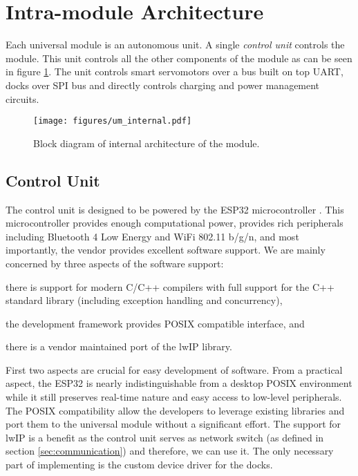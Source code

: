\section{Intra-module Architecture}

Each universal module is an autonomous unit. A single \emph{control unit}
controls the module. This unit controls all the other components of the module
as can be seen in figure \ref{fig:um_internal}. The unit controls smart
servomotors over a bus built on top UART, docks over SPI bus and directly
controls charging and power management circuits.

\begin{figure}
    \centering
    \texttt{[image: figures/um\_internal.pdf]}
    \caption{Block diagram of internal architecture of the module.}
    \label{fig:um_internal}
\end{figure}

\subsection{Control Unit}

The control unit is designed to be powered by the ESP32 microcontroller
\cite{noauthor_esp32_2018}. This microcontroller provides enough computational
power, provides rich peripherals including Bluetooth 4 Low Energy and WiFi
802.11 b/g/n, and most importantly, the vendor provides excellent software
support. We are mainly concerned by three aspects of the software support:
\begin{enumerate*}
    \item there is support for modern C/C++ compilers with full support for the
    C++ standard library (including exception handling and concurrency),
    \item the development framework provides POSIX compatible interface, and
    \item there is a vendor maintained port of the lwIP library.
\end{enumerate*}

First two aspects are crucial for easy development of software. From a practical
aspect, the ESP32 is nearly indistinguishable from a desktop POSIX environment
while it still preserves real-time nature and easy access to low-level
peripherals. The POSIX compatibility allow the developers to leverage existing
libraries and port them to the universal module without a significant effort.
The support for lwIP is a benefit as the control unit serves as network
switch (as defined in section \ref{sec:communication}) and therefore, we can
use it. The only necessary part of implementing is the custom device driver for the
docks.

